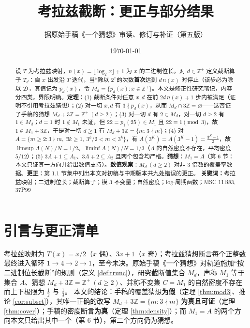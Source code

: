 \documentclass[11pt]{article}
\title{考拉兹截断：更正与部分结果}
\author{据原始手稿《一个猜想》审读、修订与补证（第五版）}
\date{\today}
\theoremstyle{definition}\newtheorem{definition}[theorem]{定义}
\theoremstyle{definition}\newtheorem{conjecture}[theorem]{猜想}
\theoremstyle{remark}\newtheorem{remark}[theorem]{注}
\begin{document}
\maketitle
\begin{abstract}
设 $T$ 为考拉兹映射，$n(x)=\lfloor\log_2x\rfloor+1$ 为 $x$ 的二进制位长。对 $d\in\mathbb{Z}^+$ 定义截断算子 $T_d$：自 $x$ 出发沿 $T$ 迭代，当“除以 2”的次数\textbf{首次}达到 $d\,n(x)$ 时停止（该步必为除以 2），其值记为 $p_d(x)$，令 $M_d=\{p_d(x):x\in\mathbb{Z}^+\}$。本文是修正性研究笔记，内容分四类，界限明确。\textbf{定理}：(1) 截断条件对任意 $x,d$ 在前 $2d\,n(x)+1$ 步内被满足（证明不引用考拉兹猜想）；(2) 对一切 $x,d$ 有 $3\nmid p_d(x)$，从而 $M_d\cap3\mathbb{Z}=\varnothing$——这否证了手稿的猜想 $M_d+3\mathbb{Z}=\mathbb{Z}^+\ (d\ge2)$；(3) 对一切 $d$ 有 $2\in M_d$，对一切 $d\ge2$ 有 $1\in M_d$；$d=1$ 时 $1\notin M_1$ 未证，但 $22=p_1(25)\in M_1$ 且 $22\equiv1\pmod3$，故 $1\in M_1+3\mathbb{Z}$，于是对一切 $d\ge1$ 有 $M_d+3\mathbb{Z}=\{m:3\nmid m\}$；(4) 对 $A=\{m\ge2:3\nmid m,\ \exists k\ge1,\ 3^k/2<m<3^k\}$，有 $A(3^K)=A(3^K-1)=\frac{3^K-1}{2}$，故 $\limsup A(N)/N=1/2$、$\liminf A(N)/N=1/3$（$A$ 的自然密度不存在，平均密度 $5/12$）；(5) $3A+1\subseteq A_1$、$3A+2\subseteq A_2$ 且两个包含均严格。\textbf{猜想}：$M_1=A$（第 6 节：本文只证其一方向并给出数值支持）。\textbf{数值观察}：$M_d\ (d\ge2)$ 对非 3 倍数的覆盖率数据。\textbf{更正}：第 1.1 节集中列出本文对初稿与中期版本共九处错误的更正。
\noindent\textbf{关键词：}考拉兹映射；二进制位长；截断算子；模 3 不变量；自然密度；log-周期函数；MSC 11B83, 37P99
\end{abstract}
\section{引言与更正清单}
考拉兹映射为 $T(x)=x/2$（$x$ 偶）、$3x+1$（$x$ 奇）；考拉兹猜想断言每个正整数最终进入循环 $1\to4\to2\to1$，至今未决。原始手稿《一个猜想》对轨道施加“按二进制位长截断”的规则（定义 \ref{def:trunc}），研究截断值集合 $M_d$，声称 $M_1$ 等于集合 $A$、猜想 $M_d+3\mathbb{Z}=\mathbb{Z}^+\ (d\ge2)$、并称不变集 $C=M_1$ 的自然密度不存在而上下极限为 $\frac12$ 与 $\frac13$。
本文的结论：手稿的覆盖猜想\textbf{为假}（定理 \ref{thm:mod3}、推论 \ref{cor:subset}），其唯一正确的改写 $M_d+3\mathbb{Z}=\{m:3\nmid m\}$ \textbf{为真且可证}（定理 \ref{thm:cover}）；手稿的密度断言\textbf{为真}（定理 \ref{thm:density}）；而 $M_1=A$ 的两个方向本文只给出其中一个（第 6 节），第二个方向仍为猜想。
\end{document}
